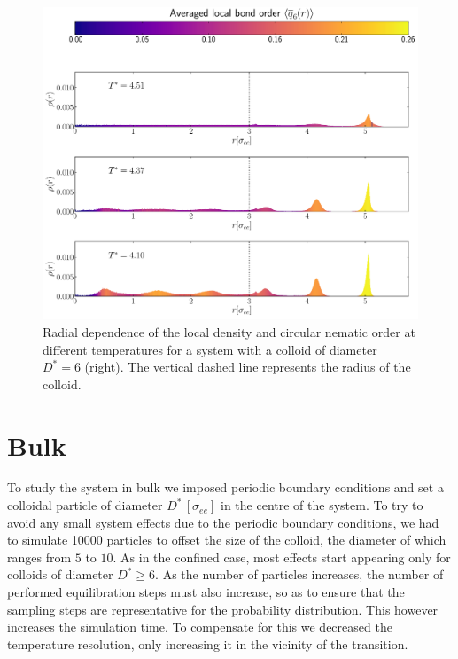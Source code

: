 \begin{figure}[H]
 \centering
 \includegraphics[width=0.8\linewidth]{plots/cfo_W8C56_raddensD6.pdf}
\caption{Radial dependence of the local density and circular nematic order at different temperatures for a system with a colloid of diameter $D^* = 6$ (right). The vertical dashed line represents the radius of the colloid.}
 \label{fig:cforaddens}
\end{figure}




\section{Bulk}
\label{sec:Bulk}
To study the system in bulk we imposed periodic boundary conditions and set a colloidal particle of diameter $D^* \, [\sigma_{ee}]$ in the centre of the system. To try to avoid any small system effects due to the periodic boundary conditions, we had to simulate 10000 particles to offset the size of the colloid, the diameter of which ranges from $5$ to $10$. As in the confined case, most effects start appearing only for colloids of diameter $D^* \geq 6$. As the number of particles increases, the number of performed equilibration steps must also increase, so as to ensure that the sampling steps are representative for the probability distribution. This however increases the simulation time. To compensate for this we decreased the temperature resolution, only increasing it in the vicinity of the transition.

